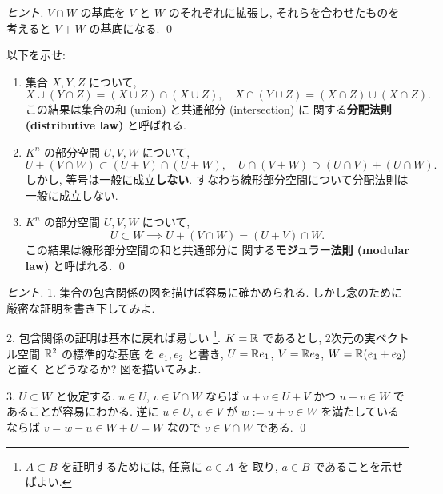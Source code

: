 \documentclass[12pt,twoside]{jarticle}
\begin{document}
\begin{proof}[ヒント]
  $V\cap W$ の基底を $V$ と $W$ のそれぞれに拡張し, 
  それらを合わせたものを考えると $V+W$ の基底になる. 
  \qed
\end{proof}


\begin{question}[線形部分空間のモジュラー法則]
  \label{q:modular-law}
  以下を示せ:
  \begin{enumerate}
  \item 集合 $X,Y,Z$ について, 
    \begin{equation*}
      X\cup(Y\cap Z)=(X\cup Z)\cap(X\cup Z), 
      \quad
      X\cap(Y\cup Z)=(X\cap Z)\cup(X\cap Z).
    \end{equation*}
    この結果は集合の和 (union) と共通部分 (intersection) に
    関する{\bf 分配法則 (distributive law)} と呼ばれる.
  \item $K^n$ の部分空間 $U,V,W$ について, 
    \begin{equation*}
      U + (V\cap W) \subset (U + V)\cap(U + W), 
      \quad
      U\cap(V + W) \supset (U\cap V)+(U\cap W).
    \end{equation*}
    しかし, 等号は一般に成立{\bf しない}.
    すなわち線形部分空間について分配法則は一般に成立しない.
  \item $K^n$ の部分空間 $U,V,W$ について, 
    \begin{equation*}
      U\subset W \implies U + (V\cap W) = (U + V)\cap W.
    \end{equation*}
    この結果は線形部分空間の和と共通部分に
    関する{\bf モジュラー法則 (modular law)} と呼ばれる.
    \qed
  \end{enumerate}
\end{question}

\begin{proof}[ヒント]
  1. 集合の包含関係の図を描けば容易に確かめられる.
  しかし念のために厳密な証明を書き下してみよ.

  2. 包含関係の証明は基本に戻れば易しい%
  \footnote{$A\subset B$ を証明するためには, 任意に $a\in A$ を
    取り, $a\in B$ であることを示せばよい.}.
  $K={\mathbb R}$ であるとし, 2次元の実ベクトル空間 ${\mathbb R}^2$ の標準的な基底
  を $e_1,e_2$ と書き, $U={\mathbb R} e_1$, $V={\mathbb R} e_2$, $W={\mathbb R}(e_1+e_2)$ と置く
  とどうなるか?  図を描いてみよ.

  3. $U\subset W$ と仮定する. 
  $u\in U$, $v\in V\cap W$ ならば $u+v\in U+V$ かつ $u+v\in W$ で
  あることが容易にわかる.
  逆に $u\in U$, $v\in V$ が $w:=u+v\in W$ を満たしている
  ならば $v=w-u\in W+U=W$ なので $v\in V\cap W$ である.
  \qed
\end{proof}
\end{document}
